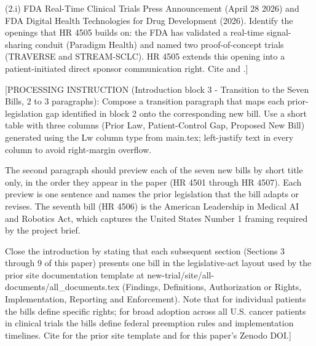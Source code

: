 (2.i) FDA Real-Time Clinical Trials Press Announcement (April 28 2026)
and FDA Digital Health Technologies for Drug Development (2026).
Identify the openings that HR 4505 builds on: the FDA has validated a
real-time signal-sharing conduit (Paradigm Health) and named two
proof-of-concept trials (TRAVERSE and STREAM-SCLC). HR 4505 extends
this opening into a patient-initiated direct sponsor communication
right. Cite \cite{fda_rtct_press_2026} and
\cite{fda_dhts_drug_development_2026}.]

[PROCESSING INSTRUCTION (Introduction block 3 - Transition to the
Seven Bills, 2 to 3 paragraphs): Compose a transition paragraph that
maps each prior-legislation gap identified in block 2 onto the
corresponding new bill. Use a short table with three columns
(Prior Law, Patient-Control Gap, Proposed New Bill) generated using
the L{w} column type from main.tex; left-justify text in every column
to avoid right-margin overflow.

The second paragraph should preview each of the seven new bills by
short title only, in the order they appear in the paper (HR 4501
through HR 4507). Each preview is one sentence and names the prior
legislation that the bill adapts or revises. The seventh bill
(HR 4506) is the American Leadership in Medical AI and Robotics Act,
which captures the United States Number 1 framing required by the
project brief.

Close the introduction by stating that each subsequent section
(Sections 3 through 9 of this paper) presents one bill in the
legislative-act layout used by the prior site documentation template
at new-trial/site/all-documents/all\_documents.tex (Findings,
Definitions, Authorization or Rights, Implementation, Reporting and
Enforcement). Note that for individual patients the bills define
specific rights; for broad adoption across all U.S. cancer patients
in clinical trials the bills define federal preemption rules and
implementation timelines. Cite \cite{kawchak_2026_19176370} for the
prior site template and \cite{kawchak_2026_20045457} for this paper's
Zenodo DOI.]
